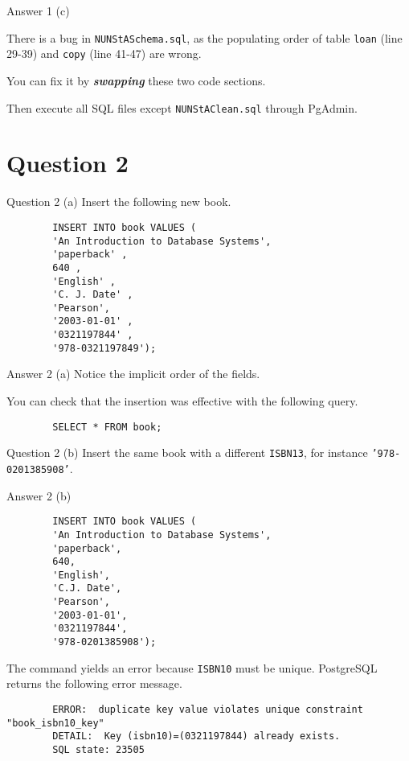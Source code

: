 \begin{frame}{Answer 1 (c)}

    There is a bug in \texttt{NUNStASchema.sql}, as the populating order of table \texttt{loan} (line 29-39) and \texttt{copy} (line 41-47) are wrong. 
    
    You can fix it by \textbf{\textit{swapping}} these two code sections.
    
    Then execute all SQL files except \texttt{NUNStAClean.sql} through PgAdmin.
\end{frame}

\section*{Question 2}

\begin{frame}{Question 2 (a)}
    Insert the following new book.
	
	\begin{lstlisting}
		INSERT INTO book VALUES (
		'An Introduction to Database Systems',
		'paperback' , 
		640 , 
		'English' , 
		'C. J. Date' , 
		'Pearson',
		'2003-01-01' , 
		'0321197844' , 
		'978-0321197849');
    \end{lstlisting}
\end{frame}

\begin{frame}{Answer 2 (a)}
    Notice the implicit order of the fields.

	You can check that the insertion was effective with the following query.
	\begin{lstlisting}
		SELECT * FROM book;
    \end{lstlisting}

\end{frame}

\begin{frame}{Question 2 (b)}
Insert the same book with a different \texttt{ISBN13}, for instance \texttt{'978-0201385908'}.
\end{frame}

\begin{frame}{Answer 2 (b)}
\begin{lstlisting}
		INSERT INTO book VALUES (
		'An Introduction to Database Systems', 
		'paperback', 
		640,
		'English',
		'C.J. Date', 
		'Pearson', 
		'2003-01-01', 
		'0321197844',  
		'978-0201385908');
\end{lstlisting}
	
	The command yields an error  because \texttt{ISBN10} must be unique. PostgreSQL returns the following error message.
	
	\begin{verbatim}
		ERROR:  duplicate key value violates unique constraint "book_isbn10_key"
		DETAIL:  Key (isbn10)=(0321197844) already exists.
		SQL state: 23505
	\end{verbatim}
	
\end{frame}


